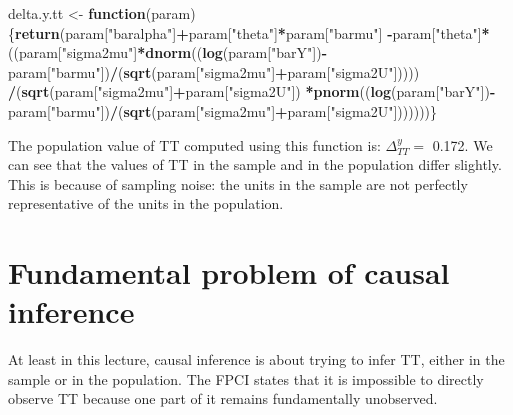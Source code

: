 \documentclass[]{book}
\newenvironment{Shaded}{\begin{snugshade}}{\end{snugshade}}
\newcommand{\ControlFlowTok}[1]{\textcolor[rgb]{0.13,0.29,0.53}{\textbf{#1}}}
\newcommand{\KeywordTok}[1]{\textcolor[rgb]{0.13,0.29,0.53}{\textbf{#1}}}
\newcommand{\NormalTok}[1]{#1}
\newcommand{\OperatorTok}[1]{\textcolor[rgb]{0.81,0.36,0.00}{\textbf{#1}}}
\newcommand{\StringTok}[1]{\textcolor[rgb]{0.31,0.60,0.02}{#1}}
\theoremstyle{definition}
\theoremstyle{definition}
\theoremstyle{definition}
\theoremstyle{remark}
\begin{document}
\begin{Shaded}
\begin{Highlighting}[]
\NormalTok{delta.y.tt <-}\StringTok{ }\ControlFlowTok{function}\NormalTok{(param)\{}\KeywordTok{return}\NormalTok{(param[}\StringTok{"baralpha"}\NormalTok{]}\OperatorTok{+}\NormalTok{param[}\StringTok{"theta"}\NormalTok{]}\OperatorTok{*}\NormalTok{param[}\StringTok{"barmu"}\NormalTok{]}
                                     \OperatorTok{-}\NormalTok{param[}\StringTok{"theta"}\NormalTok{]}\OperatorTok{*}\NormalTok{((param[}\StringTok{"sigma2mu"}\NormalTok{]}\OperatorTok{*}\KeywordTok{dnorm}\NormalTok{((}\KeywordTok{log}\NormalTok{(param[}\StringTok{"barY"}\NormalTok{])}\OperatorTok{-}\NormalTok{param[}\StringTok{"barmu"}\NormalTok{])}\OperatorTok{/}\NormalTok{(}\KeywordTok{sqrt}\NormalTok{(param[}\StringTok{"sigma2mu"}\NormalTok{]}\OperatorTok{+}\NormalTok{param[}\StringTok{"sigma2U"}\NormalTok{]))))}
                                                      \OperatorTok{/}\NormalTok{(}\KeywordTok{sqrt}\NormalTok{(param[}\StringTok{"sigma2mu"}\NormalTok{]}\OperatorTok{+}\NormalTok{param[}\StringTok{"sigma2U"}\NormalTok{])}
                                                        \OperatorTok{*}\KeywordTok{pnorm}\NormalTok{((}\KeywordTok{log}\NormalTok{(param[}\StringTok{"barY"}\NormalTok{])}\OperatorTok{-}\NormalTok{param[}\StringTok{"barmu"}\NormalTok{])}\OperatorTok{/}\NormalTok{(}\KeywordTok{sqrt}\NormalTok{(param[}\StringTok{"sigma2mu"}\NormalTok{]}\OperatorTok{+}\NormalTok{param[}\StringTok{"sigma2U"}\NormalTok{]))))))\}}
\end{Highlighting}
\end{Shaded}

The population value of TT computed using this function is: \(\Delta^y_{TT}=\) 0.172.
We can see that the values of TT in the sample and in the population differ slightly.
This is because of sampling noise: the units in the sample are not perfectly representative of the units in the population.

\hypertarget{fundamental-problem-of-causal-inference}{%
\section{Fundamental problem of causal inference}\label{fundamental-problem-of-causal-inference}}

At least in this lecture, causal inference is about trying to infer TT, either in the sample or in the population.
The FPCI states that it is impossible to directly observe TT because one part of it remains fundamentally unobserved.
\end{document}
